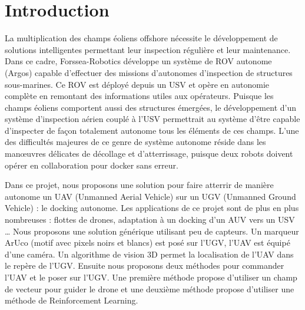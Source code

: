 \section{Introduction}

La multiplication des champs éoliens offshore nécessite le développement de solutions intelligentes permettant leur inspection régulière et leur maintenance. Dans ce cadre, Forssea-Robotics développe un système de ROV autonome (Argos\cite{forssea}) capable d’effectuer des missions d’autonomes d’inspection de structures sous-marines. Ce ROV est déployé depuis un USV et opère en autonomie complète en remontant des informations utiles aux opérateurs. Puisque les champs éoliens comportent aussi des structures émergées, le développement d’un système d’inspection aérien couplé à l’USV permettrait au système d’être capable d'inspecter de façon totalement autonome tous les éléments de ces champs. L’une des difficultés majeures de ce genre de système autonome réside dans les manœuvres délicates de décollage et d'atterrissage, puisque deux robots doivent opérer en collaboration pour docker sans erreur.

Dans ce projet, nous proposons une solution pour faire atterrir de manière autonome un UAV (Unmanned Aerial Vehicle) sur un UGV (Unmanned Ground Vehicle) : le docking autonome. Les applications de ce projet sont de plus en plus nombreuses : flottes de drones, adaptation à un docking d’un AUV vers un USV …
Nous proposons une solution générique utilisant peu de capteurs. Un marqueur ArUco (motif avec pixels noirs et blancs) est posé sur l’UGV, l’UAV est équipé d’une caméra. Un algorithme de vision 3D permet la localisation de l’UAV dans le repère de l’UGV. Ensuite nous proposons deux méthodes pour commander l’UAV et le poser sur l’UGV. Une première méthode propose d’utiliser un champ de vecteur pour guider le drone et une deuxième méthode propose d’utiliser une méthode de Reinforcement Learning.
